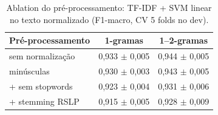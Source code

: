 \begin{table}[t]\centering\small
\caption{Ablation do pré-processamento: TF-IDF + SVM linear no texto normalizado (F1-macro, CV 5 folds no dev).}\label{tab:ablation}
\begin{tabular}{lcc}
\toprule
Pré-processamento & 1-gramas & 1--2-gramas \\
\midrule
sem normalização & 0,933 $\pm$ 0,005 & 0,944 $\pm$ 0,005 \\
minúsculas & 0,930 $\pm$ 0,003 & 0,943 $\pm$ 0,005 \\
+ sem stopwords & 0,923 $\pm$ 0,004 & 0,931 $\pm$ 0,006 \\
+ stemming RSLP & 0,915 $\pm$ 0,005 & 0,928 $\pm$ 0,009 \\
\bottomrule
\end{tabular}
\end{table}
